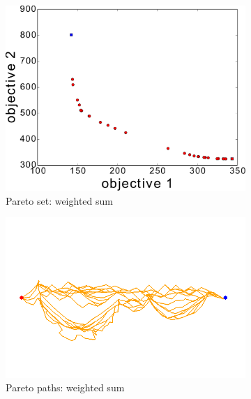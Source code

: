 \documentclass{article}
\begin{document}
\begin{figure}
\begin{subfigure}[b]{0.45\linewidth}
		\includegraphics[width=\textwidth]{fig/sim8-nconvex/PF03-MORRT.pdf}
		\caption{Pareto set: weighted sum}
		\label{fig:sim:nonconvex:pf:a}
	\end{subfigure}
	\begin{subfigure}[b]{0.45\linewidth}
		\centering
		\includegraphics[width=\textwidth]{fig/sim8-nconvex/MORRTstar03-ALL.png}
		\caption{Pareto paths: weighted sum}
		\label{fig:sim:nonconvex:sols:a}
	\end{subfigure}  \\
	\begin{subfigure}[b]{0.45\linewidth}
		\centering

\end{subfigure}
\end{figure}
\end{document}
